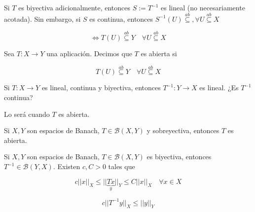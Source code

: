 Si $T$ es biyectiva adicionalmente, entonces $S:=T^{-1}$ es lineal (no necesariamente acotada).
Sin embargo, si $S$ es continua, entonces $S^{-1}(U)\overset{ab}{\subseteq},\forall U\overset{ab}{\subseteq}X$

\[\iff T(U)\overset{ab}{\subseteq}Y\quad \forall U\overset{ab}{\subseteq}X\]

\begin{fdefinition}
    Sea $T:X\to Y$ una aplicación. Decimos que $T$ es abierta si 
    
    \[T(U)\overset{ab}{\subseteq}Y\quad \forall U\overset{ab}{\subseteq}X\]
\end{fdefinition}

Si $T:X\to Y$ es lineal, continua y biyectiva, entonces $T^{-1}:Y\to X$ es lineal. ¿Es $T^{-1}$ continua?

Lo será cuando $T$ es abierta.

\begin{ftheorem}
    Si $X,Y$ son espacios de Banach, $T\in \mathcal{B}(X,Y)$ y sobreyectiva, entonces $T$ es abierta.
\end{ftheorem}

\begin{fcorollary}
    Si $X,Y$ son espacios de Banach, $T\in\mathcal{B}(X,Y)$ es biyectiva, entonces $T^{-1}\in\mathcal{B}(Y,X)$. Existen $c,C>0$ tales que

    \[c||x||_X\leq ||\underbrace{Tx}_{y}||_Y\leq C||x||_X\quad \forall x\in X\]

    \[c||T^{-1}y||_X\leq ||y||_Y\]
\end{fcorollary}

